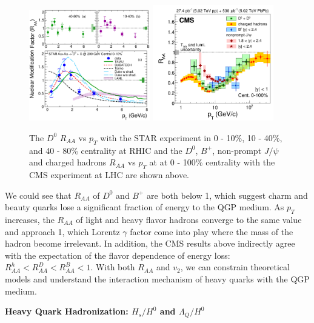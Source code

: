 \begin{figure}[hbtp]
\begin{center}
\includegraphics[width=0.47\textwidth]{Figures/Chapter1/STARRAA.eps}
\includegraphics[width=0.47\textwidth]{Figures/Chapter1/CMSRAA.png}
\caption{The $D^0$ $R_{AA}$ vs $p_T$ with the STAR experiment in 0 - 10\%, 10 - 40\%, and 40 - 80\% centrality at RHIC and the $D^0$, $B^+$, non-prompt $J/\psi$ and charged hadrons $R_{AA}$ vs $p_T$ at at 0 - 100\% centrality with the CMS experiment at LHC are shown above.}
\label{HQRAA}
\end{center}
\end{figure}   

We could see that $R_{AA}$ of $D^0$ and $B^+$ are both below 1, which suggest charm and beauty quarks lose a significant fraction of energy to the QGP medium. As $p_T$ increases, the $R_{AA}$ of light and heavy flavor hadrons converge to the same value and approach 1, which Lorentz $\gamma$ factor come into play where the mass of the hadron become irrelevant. In addition, the CMS results above indirectly agree with the expectation of the flavor dependence of energy loss: $R_{AA}^{h} < R_{AA}^{D} < R_{AA}^{B} < 1$. With both $R_{AA}$ and $v_2$, we can constrain theoretical models and understand the interaction mechanism of heavy quarks with the QGP medium.

\textbf{Heavy Quark Hadronization: $H_s/H^0$ and $\Lambda_{Q}/H^{0}$}


